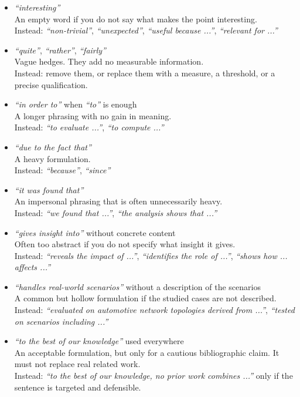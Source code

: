 \documentclass[11pt,a4paper]{article}
\theoremstyle{definition}
\begin{document}
\begin{itemize}
    \item \textit{``interesting''} \\
    An empty word if you do not say what makes the point interesting. \\
    Instead: \textit{``non-trivial''}, \textit{``unexpected''}, \textit{``useful because ...''}, \textit{``relevant for ...''}

    \item \textit{``quite''}, \textit{``rather''}, \textit{``fairly''} \\
    Vague hedges. They add no measurable information. \\
    Instead: remove them, or replace them with a measure, a threshold, or a precise qualification.

    \item \textit{``in order to''} when \textit{``to''} is enough \\
    A longer phrasing with no gain in meaning. \\
    Instead: \textit{``to evaluate ...''}, \textit{``to compute ...''}

    \item \textit{``due to the fact that''} \\
    A heavy formulation. \\
    Instead: \textit{``because''}, \textit{``since''}

    \item \textit{``it was found that''} \\
    An impersonal phrasing that is often unnecessarily heavy. \\
    Instead: \textit{``we found that ...''}, \textit{``the analysis shows that ...''}

    \item \textit{``gives insight into''} without concrete content \\
    Often too abstract if you do not specify what insight it gives. \\
    Instead: \textit{``reveals the impact of ...''}, \textit{``identifies the role of ...''}, \textit{``shows how ... affects ...''}

    \item \textit{``handles real-world scenarios''} without a description of the scenarios \\
    A common but hollow formulation if the studied cases are not described. \\
    Instead: \textit{``evaluated on automotive network topologies derived from ...''}, \textit{``tested on scenarios including ...''}

    \item \textit{``to the best of our knowledge''} used everywhere \\
    An acceptable formulation, but only for a cautious bibliographic claim. It must not replace real related work. \\
    Instead: \textit{``to the best of our knowledge, no prior work combines ...''} only if the sentence is targeted and defensible.

\end{itemize}
\end{document}
